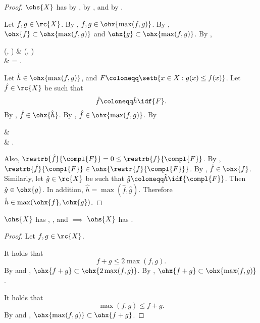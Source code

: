 \documentclass[b5paper, english, oneside]{memoir}
\begin{document}
\begin{proof}
$\ohs{X}$ has  by ,  by , and  by .

\proofpart{$\subset$} 
Let $f, g \in \rc{X}$. By , $f, g \in \ohx{\max(f, g)}$. By , $\ohx{f} \subset \ohx{\max(f, g)}$ and $\ohx{g} \subset \ohx{\max(f, g)}$.  By ,
\begin{eqs}
\max(, ) & \subset \max(, ) \\
{} & = .
\end{eqs}

\proofpart{$\supset$}
Let $\hat{h} \in \ohx{\max(f, g)}$, and $F \coloneqq \setb{x \in X : g(x) \leq f(x)}$. Let $\hat{f} \in \rc{X}$ be such that
\begin{equation}
\hat{f} \coloneqq \hat{h} \idf{F}.
\end{equation}
By , $\hat{f} \in \ohx{\hat{h}}$. By , $\hat{f} \in \ohx{\max(f, g)}$. By 
\begin{eqs}
 & \in {} \\
{} & \subset {}.
\end{eqs}
Also, $\restrb{\hat{f}}{\compl{F}} = 0 \leq \restrb{f}{\compl{F}}$. By , $\restrb{\hat{f}}{\compl{F}} \in \ohx{\restr{f}{\compl{F}}}$. By , $\hat{f} \in \ohx{f}$. Similarly, let $\hat{g} \in \rc{X}$ be such that $\hat{g} \coloneqq \hat{h} \idf{\compl{F}}$. Then $\hat{g} \in \ohx{g}$. In addition, $\hat{h} = \max(\hat{f}, \hat{g})$. Therefore $\hat{h} \in \max(\ohx{f}, \ohx{g})$.

\end{proof}

\begin{theorem}
\label{SummationIsImplied}
$\ohs{X}$ has , , and  $\implies$ $\ohs{X}$ has .
\end{theorem}

\begin{proof}
Let $f, g \in \rc{X}$. 

\proofpart{$\subset$} 
It holds that
\begin{equation}
f + g \leq 2 \max(f, g).
\end{equation}
By  and , $\ohx{f + g} \subset \ohx{2 \max(f, g)}$. By , $\ohx{f + g} \subset \ohx{\max(f, g)}$.

\proofpart{$\supset$} 
It holds that
\begin{equation}
\max(f, g) \leq f + g.
\end{equation}
By  and , $\ohx{\max(f, g)} \subset \ohx{f + g}$.

\end{proof}
\end{document}
